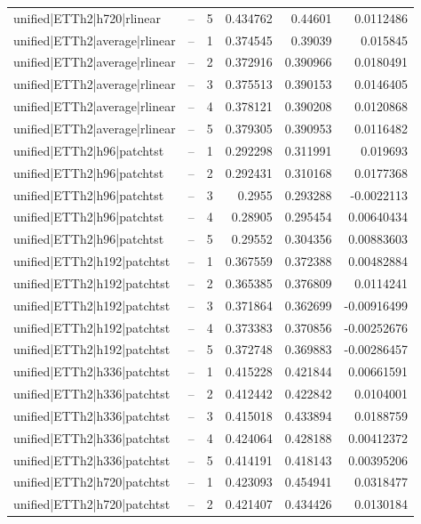 \begin{longtable}{llrrrr}
unified|ETTh2|h720|rlinear & -- & 5 & 0.434762 & 0.44601 & 0.0112486 \\
unified|ETTh2|average|rlinear & -- & 1 & 0.374545 & 0.39039 & 0.015845 \\
unified|ETTh2|average|rlinear & -- & 2 & 0.372916 & 0.390966 & 0.0180491 \\
unified|ETTh2|average|rlinear & -- & 3 & 0.375513 & 0.390153 & 0.0146405 \\
unified|ETTh2|average|rlinear & -- & 4 & 0.378121 & 0.390208 & 0.0120868 \\
unified|ETTh2|average|rlinear & -- & 5 & 0.379305 & 0.390953 & 0.0116482 \\
unified|ETTh2|h96|patchtst & -- & 1 & 0.292298 & 0.311991 & 0.019693 \\
unified|ETTh2|h96|patchtst & -- & 2 & 0.292431 & 0.310168 & 0.0177368 \\
unified|ETTh2|h96|patchtst & -- & 3 & 0.2955 & 0.293288 & -0.0022113 \\
unified|ETTh2|h96|patchtst & -- & 4 & 0.28905 & 0.295454 & 0.00640434 \\
unified|ETTh2|h96|patchtst & -- & 5 & 0.29552 & 0.304356 & 0.00883603 \\
unified|ETTh2|h192|patchtst & -- & 1 & 0.367559 & 0.372388 & 0.00482884 \\
unified|ETTh2|h192|patchtst & -- & 2 & 0.365385 & 0.376809 & 0.0114241 \\
unified|ETTh2|h192|patchtst & -- & 3 & 0.371864 & 0.362699 & -0.00916499 \\
unified|ETTh2|h192|patchtst & -- & 4 & 0.373383 & 0.370856 & -0.00252676 \\
unified|ETTh2|h192|patchtst & -- & 5 & 0.372748 & 0.369883 & -0.00286457 \\
unified|ETTh2|h336|patchtst & -- & 1 & 0.415228 & 0.421844 & 0.00661591 \\
unified|ETTh2|h336|patchtst & -- & 2 & 0.412442 & 0.422842 & 0.0104001 \\
unified|ETTh2|h336|patchtst & -- & 3 & 0.415018 & 0.433894 & 0.0188759 \\
unified|ETTh2|h336|patchtst & -- & 4 & 0.424064 & 0.428188 & 0.00412372 \\
unified|ETTh2|h336|patchtst & -- & 5 & 0.414191 & 0.418143 & 0.00395206 \\
unified|ETTh2|h720|patchtst & -- & 1 & 0.423093 & 0.454941 & 0.0318477 \\
unified|ETTh2|h720|patchtst & -- & 2 & 0.421407 & 0.434426 & 0.0130184 \\

\end{longtable}
